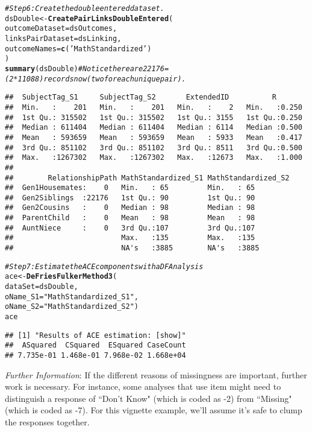 \documentclass{article}\usepackage[]{graphicx}\usepackage[]{color}
\makeatletter
\newcommand{\hlstr}[1]{\textcolor[rgb]{0.192,0.494,0.8}{#1}}%
\newcommand{\hlcom}[1]{\textcolor[rgb]{0.678,0.584,0.686}{\textit{#1}}}%
\newcommand{\hlstd}[1]{\textcolor[rgb]{0.345,0.345,0.345}{#1}}%
\newcommand{\hlkwb}[1]{\textcolor[rgb]{0.69,0.353,0.396}{#1}}%
\newcommand{\hlkwc}[1]{\textcolor[rgb]{0.333,0.667,0.333}{#1}}%
\newcommand{\hlkwd}[1]{\textcolor[rgb]{0.737,0.353,0.396}{\textbf{#1}}}%
\newenvironment{kframe}{%
 \def\at@end@of@kframe{}%
 \ifinner\ifhmode%
  \def\at@end@of@kframe{\end{minipage}}%
  \begin{minipage}{\columnwidth}%
 \fi\fi%
 \def\FrameCommand##1{\hskip\@totalleftmargin \hskip-\fboxsep
 \colorbox{shadecolor}{##1}\hskip-\fboxsep
     \hskip-\linewidth \hskip-\@totalleftmargin \hskip\columnwidth}%
 \MakeFramed {\advance\hsize-\width
   \@totalleftmargin\z@ \linewidth\hsize
   \@setminipage}}%
 {\par\unskip\endMakeFramed%
 \at@end@of@kframe}
\newenvironment{knitrout}{}{} %
\makeatother
\begin{document}
\begin{knitrout}
\begin{kframe}
\begin{alltt}
\hlcom{#Step 6: Create the double entered dataset.}
\hlstd{dsDouble} \hlkwb{<-} \hlkwd{CreatePairLinksDoubleEntered}\hlstd{(}
  \hlkwc{outcomeDataset}\hlstd{=dsOutcomes,}
  \hlkwc{linksPairDataset}\hlstd{=dsLinking,}
  \hlkwc{outcomeNames}\hlstd{=}\hlkwd{c}\hlstd{(}\hlstr{'MathStandardized'}\hlstd{)}
\hlstd{)}
\hlkwd{summary}\hlstd{(dsDouble)} \hlcom{#Notice there are 22176=(2*11088) records now (two for each unique pair).}
\end{alltt}
\begin{verbatim}
##  SubjectTag_S1     SubjectTag_S2       ExtendedID          R        
##  Min.   :    201   Min.   :    201   Min.   :    2   Min.   :0.250  
##  1st Qu.: 315502   1st Qu.: 315502   1st Qu.: 3155   1st Qu.:0.250  
##  Median : 611404   Median : 611404   Median : 6114   Median :0.500  
##  Mean   : 593659   Mean   : 593659   Mean   : 5933   Mean   :0.417  
##  3rd Qu.: 851102   3rd Qu.: 851102   3rd Qu.: 8511   3rd Qu.:0.500  
##  Max.   :1267302   Max.   :1267302   Max.   :12673   Max.   :1.000  
##                                                                     
##        RelationshipPath MathStandardized_S1 MathStandardized_S2
##  Gen1Housemates:    0   Min.   : 65         Min.   : 65        
##  Gen2Siblings  :22176   1st Qu.: 90         1st Qu.: 90        
##  Gen2Cousins   :    0   Median : 98         Median : 98        
##  ParentChild   :    0   Mean   : 98         Mean   : 98        
##  AuntNiece     :    0   3rd Qu.:107         3rd Qu.:107        
##                         Max.   :135         Max.   :135        
##                         NA's   :3885        NA's   :3885
\end{verbatim}
\begin{alltt}
\hlcom{#Step 7: Estimate the ACE components with a DF Analysis }
\hlstd{ace} \hlkwb{<-} \hlkwd{DeFriesFulkerMethod3}\hlstd{(}
    \hlkwc{dataSet}\hlstd{=dsDouble,}
    \hlkwc{oName_S1}\hlstd{=}\hlstr{"MathStandardized_S1"}\hlstd{,}
    \hlkwc{oName_S2}\hlstd{=}\hlstr{"MathStandardized_S2"}\hlstd{)}
\hlstd{ace}
\end{alltt}
\begin{verbatim}
## [1] "Results of ACE estimation: [show]"
##  ASquared  CSquared  ESquared CaseCount 
## 7.735e-01 1.468e-01 7.968e-02 1.668e+04
\end{verbatim}
\end{kframe}
\end{knitrout}


\emph{Further Information}: If the different reasons of missingness are important, further work is necessary.  For instance, some analyses that use item  might need to distinguish a response of ``Don't Know" (which is coded as -2) from ``Missing" (which is coded as -7).  For this vignette example, we'll assume it's safe to clump the responses together.
\end{document}
